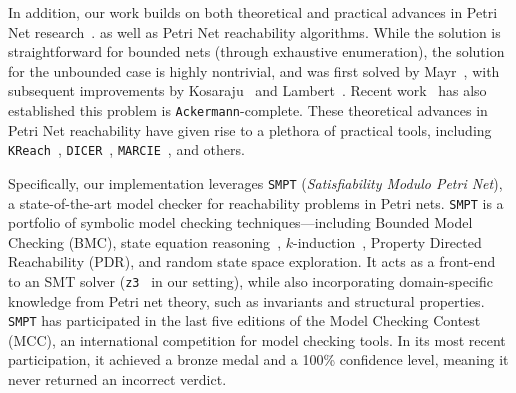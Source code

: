 In addition, our work builds on both theoretical and practical advances in 
Petri Net research~\cite{Mu89, Es96, Re12, EsNi24}. 
%
as well as Petri Net reachability algorithms. While the solution is 
straightforward for bounded nets (through exhaustive enumeration), the solution 
for the unbounded case is highly nontrivial, and was first solved by 
Mayr~\cite{Ma81}, with subsequent improvements by Kosaraju~\cite{Ko82} and 
Lambert~\cite{La92}. Recent work~\cite{CzWo22} has also established this 
problem is \texttt{Ackermann}-complete.
%
These theoretical advances in Petri Net reachability have given rise to a 
plethora of practical tools, including \texttt{KReach}~\cite{DiLa20}, 
\texttt{DICER}~\cite{XiZhLi21}, \texttt{MARCIE}~\cite{HeRoSc13}, and others. 

Specifically, our implementation leverages \texttt{SMPT} (\emph{Satisfiability Modulo Petri Net})\cite{AmDa23}, a state-of-the-art model checker for reachability problems in Petri nets. \texttt{SMPT} is a portfolio of symbolic model checking techniques—including Bounded Model Checking (BMC)\cite{biere_symbolic_1999}, state equation reasoning~\cite{murata_state_1977}, $k$-induction~\cite{sheeran_checking_2000}, Property Directed Reachability (PDR)\cite{bradley_sat-based_2011,AmDaHu22}, and random state space exploration. It acts as a front-end to an SMT solver (\texttt{z3}~\cite{DeBj08} in our setting), while also incorporating domain-specific knowledge from Petri net theory, such as invariants and structural properties. \texttt{SMPT} has participated in the last five editions of the Model Checking Contest (MCC), an international competition for model checking tools. In its most recent participation, it achieved a bronze medal and a 100\% confidence level, meaning it never returned an incorrect verdict\cite{mcc:2025}.

